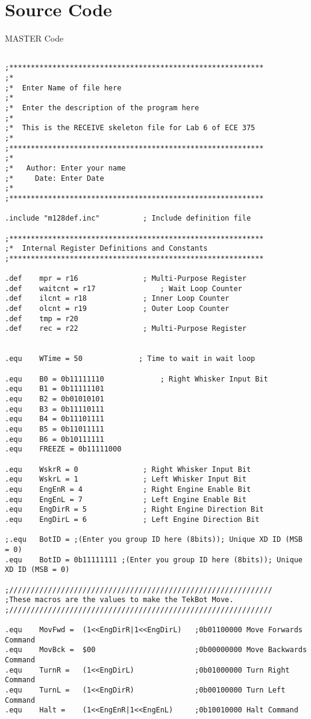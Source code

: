 \documentclass[12pt,letterpaper]{article}
\begin{document}
\section{Source Code}
MASTER Code
\begin{verbatim}

;***********************************************************
;*
;*	Enter Name of file here
;*
;*	Enter the description of the program here
;*
;*	This is the RECEIVE skeleton file for Lab 6 of ECE 375
;*
;***********************************************************
;*
;*	 Author: Enter your name
;*	   Date: Enter Date
;*
;***********************************************************

.include "m128def.inc"			; Include definition file

;***********************************************************
;*	Internal Register Definitions and Constants
;***********************************************************

.def    mpr = r16               ; Multi-Purpose Register
.def    waitcnt = r17               ; Wait Loop Counter
.def    ilcnt = r18             ; Inner Loop Counter
.def    olcnt = r19             ; Outer Loop Counter
.def    tmp = r20
.def	rec = r22				; Multi-Purpose Register


.equ    WTime = 50             ; Time to wait in wait loop

.equ	B0 = 0b11111110				; Right Whisker Input Bit
.equ	B1 = 0b11111101
.equ	B2 = 0b01010101
.equ	B3 = 0b11110111
.equ	B4 = 0b11101111
.equ	B5 = 0b11011111
.equ	B6 = 0b10111111
.equ	FREEZE = 0b11111000

.equ	WskrR = 0				; Right Whisker Input Bit
.equ	WskrL = 1				; Left Whisker Input Bit
.equ	EngEnR = 4				; Right Engine Enable Bit
.equ	EngEnL = 7				; Left Engine Enable Bit
.equ	EngDirR = 5				; Right Engine Direction Bit
.equ	EngDirL = 6				; Left Engine Direction Bit

;.equ	BotID = ;(Enter you group ID here (8bits)); Unique XD ID (MSB = 0)
.equ	BotID = 0b11111111 ;(Enter you group ID here (8bits)); Unique XD ID (MSB = 0)

;/////////////////////////////////////////////////////////////
;These macros are the values to make the TekBot Move.
;/////////////////////////////////////////////////////////////

.equ	MovFwd =  (1<<EngDirR|1<<EngDirL)	;0b01100000 Move Forwards Command
.equ	MovBck =  $00						;0b00000000 Move Backwards Command
.equ	TurnR =   (1<<EngDirL)				;0b01000000 Turn Right Command
.equ	TurnL =   (1<<EngDirR)				;0b00100000 Turn Left Command
.equ	Halt =    (1<<EngEnR|1<<EngEnL)		;0b10010000 Halt Command


\end{verbatim}
\end{document}
